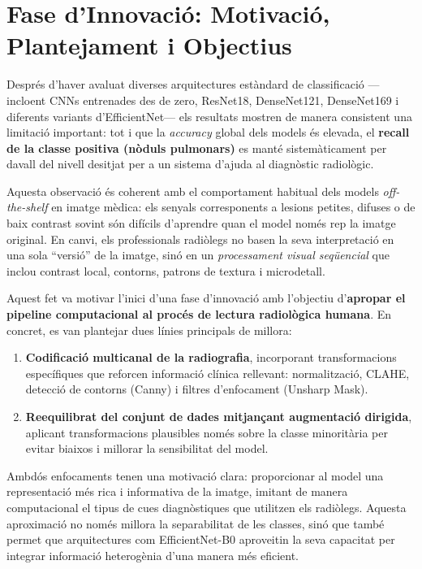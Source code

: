 \documentclass[12pt,a4paper]{article}
\begin{document}
\section{Fase d'Innovació: Motivació, Plantejament i Objectius}

Després d'haver avaluat diverses arquitectures estàndard de classificació ---incloent
CNNs entrenades des de zero, ResNet18, DenseNet121, DenseNet169 i diferents variants
d'EfficientNet--- els resultats mostren de manera consistent una limitació important:
tot i que la \textit{accuracy} global dels models és elevada, el \textbf{recall de la
classe positiva (nòduls pulmonars)} es manté sistemàticament per davall del nivell
desitjat per a un sistema d'ajuda al diagnòstic radiològic.

Aquesta observació és coherent amb el comportament habitual dels models
\textit{off-the-shelf} en imatge mèdica: els senyals corresponents a lesions petites,
difuses o de baix contrast sovint són difícils d'aprendre quan el model només rep la
imatge original. En canvi, els professionals radiòlegs no basen la seva interpretació en
una sola ``versió'' de la imatge, sinó en un \textit{processament visual seqüencial} que
inclou contrast local, contorns, patrons de textura i microdetall.

Aquest fet va motivar l'inici d'una fase d'innovació amb l'objectiu d'\textbf{apropar el
pipeline computacional al procés de lectura radiològica humana}. En concret, es van
plantejar dues línies principals de millora:

\begin{enumerate}
    \item \textbf{Codificació multicanal de la radiografia}, incorporant transformacions
    específiques que reforcen informació clínica rellevant: normalització, CLAHE,
    detecció de contorns (Canny) i filtres d'enfocament (Unsharp Mask).
    \item \textbf{Reequilibrat del conjunt de dades mitjançant augmentació dirigida},
    aplicant transformacions plausibles només sobre la classe minoritària per evitar
    biaixos i millorar la sensibilitat del model.
\end{enumerate}

Ambdós enfocaments tenen una motivació clara: proporcionar al model una representació més
rica i informativa de la imatge, imitant de manera computacional el tipus de cues
diagnòstiques que utilitzen els radiòlegs. Aquesta aproximació no només millora la
separabilitat de les classes, sinó que també permet que arquitectures com EfficientNet-B0
aproveitin la seva capacitat per integrar informació heterogènia d'una manera més
eficient.
\end{document}

